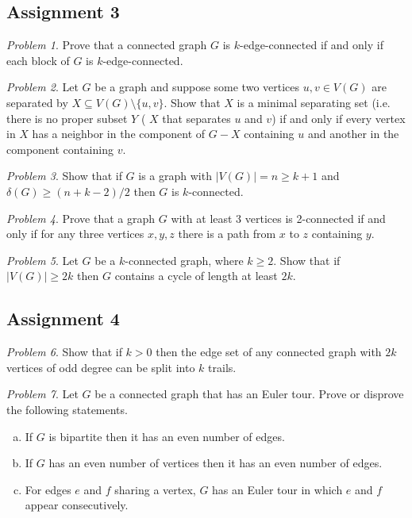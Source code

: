 \documentclass[11pt, fleqn, a4paper, landscape]{article}
\theoremstyle{plain} %
\theoremstyle{remark} %
\newtheorem{problem}{Problem}
\theoremstyle{definition} %
\begin{document}
\begin{multicols}{3}
\subsection{Assignment 3}

\begin{problem}
Prove that a connected graph $G$ is $k$-edge-connected if and only if each block of $G$ is $k$-edge-connected.
\end{problem}

\begin{problem}
Let $G$ be a graph and suppose some two vertices $u, v \in V (G)$ are separated by $X \subseteq V (G)\setminus\{u,v\}$. Show that $X$ is a minimal separating set (i.e. there is no proper subset $Y$ ( $X$ that separates $u$ and $v$) if and only if every vertex in $X$ has a neighbor in the component
of $G-X$ containing $u$ and another in the component containing $v$.
\end{problem}

\begin{problem}
Show that if $G$ is a graph with $|V (G)| = n \ge k + 1$ and $\delta(G) \ge(n + k-2)/2$ then $G$ is $k$-connected.
\end{problem}

\begin{problem}
Prove that a graph $G$ with at least 3 vertices is 2-connected if and only if for any three vertices $x, y, z$ there is a path from $x$ to $z$ containing $y$.
\end{problem}

\begin{problem}
Let $G$ be a $k$-connected graph, where $k \ge 2$. Show that if $|V (G)| \ge 2k$ then $G$ contains a cycle of length at least $2k$.
\end{problem}

\subsection{Assignment 4}

\begin{problem}
Show that if $k > 0$ then the edge set of any connected graph with $2k$ vertices of odd degree can be split into $k$ trails.
\end{problem}

\begin{problem}
Let $G$ be a connected graph that has an Euler tour. Prove or disprove the
following statements.
\begin{enumerate}[(a)]
\item If $G$ is bipartite then it has an even number of edges.
\item If $G$ has an even number of vertices then it has an even number of edges.
\item For edges $e$ and $f$ sharing a vertex, $G$ has an Euler tour in which $e$ and $f$ appear consecutively.
\end{enumerate}
\end{problem}


\end{multicols}
\end{document}
